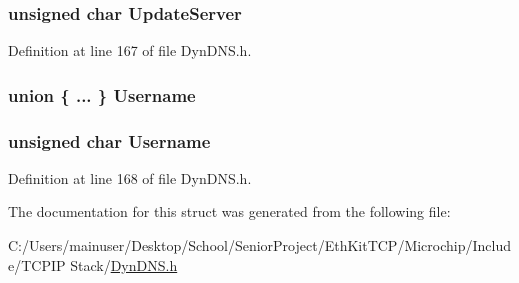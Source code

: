 \subsubsection[{Update\+Server}]{\setlength{\rightskip}{0pt plus 5cm}unsigned char Update\+Server}\label{struct_d_d_n_s___p_o_i_n_t_e_r_s_a34435a506cc32ce707957efa77001035}


Definition at line 167 of file Dyn\+D\+N\+S.\+h.

\hypertarget{struct_d_d_n_s___p_o_i_n_t_e_r_s_a671e04da9e73b30949db5b6db5bbcf99}{}
\subsubsection[{Username}]{\setlength{\rightskip}{0pt plus 5cm}union \{ ... \}   Username}\label{struct_d_d_n_s___p_o_i_n_t_e_r_s_a671e04da9e73b30949db5b6db5bbcf99}
\hypertarget{struct_d_d_n_s___p_o_i_n_t_e_r_s_a7892428b189b5a1d1a9fc8a3d8a30529}{}
\subsubsection[{Username}]{\setlength{\rightskip}{0pt plus 5cm}unsigned char Username}\label{struct_d_d_n_s___p_o_i_n_t_e_r_s_a7892428b189b5a1d1a9fc8a3d8a30529}


Definition at line 168 of file Dyn\+D\+N\+S.\+h.



The documentation for this struct was generated from the following file\+:\begin{DoxyCompactItemize}
\item 
C\+:/\+Users/mainuser/\+Desktop/\+School/\+Senior\+Project/\+Eth\+Kit\+T\+C\+P/\+Microchip/\+Include/\+T\+C\+P\+I\+P Stack/\hyperlink{_dyn_d_n_s_8h}{Dyn\+D\+N\+S.\+h}\end{DoxyCompactItemize}
